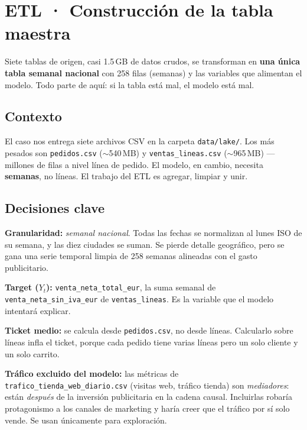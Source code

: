 \section{ETL · Construcción de la tabla maestra}

\begin{takeaway}
Siete tablas de origen, casi 1.5\,GB de datos crudos, se transforman en \textbf{una única tabla semanal nacional} con 258 filas (semanas) y las variables que alimentan el modelo. Todo parte de aquí: si la tabla está mal, el modelo está mal.
\end{takeaway}

\subsection{Contexto}

El caso nos entrega siete archivos CSV en la carpeta \texttt{data/lake/}. Los más pesados son \texttt{pedidos.csv} ($\sim$540\,MB) y \texttt{ventas\_lineas.csv} ($\sim$965\,MB) — millones de filas a nivel línea de pedido. El modelo, en cambio, necesita \textbf{semanas}, no líneas. El trabajo del ETL es agregar, limpiar y unir.

\subsection{Decisiones clave}

\begin{decisionbox}
\textbf{Granularidad:} \textit{semanal nacional}. Todas las fechas se normalizan al lunes ISO de su semana, y las diez ciudades se suman. Se pierde detalle geográfico, pero se gana una serie temporal limpia de 258 semanas alineadas con el gasto publicitario.
\end{decisionbox}

\begin{decisionbox}
\textbf{Target ($Y_t$):} \texttt{venta\_neta\_total\_eur}, la suma semanal de \texttt{venta\_neta\_sin\_iva\_eur} de \texttt{ventas\_lineas}. Es la variable que el modelo intentará explicar.
\end{decisionbox}

\begin{decisionbox}
\textbf{Ticket medio:} se calcula desde \texttt{pedidos.csv}, no desde líneas. Calcularlo sobre líneas infla el ticket, porque cada pedido tiene varias líneas pero un solo cliente y un solo carrito.
\end{decisionbox}

\begin{decisionbox}
\textbf{Tráfico excluido del modelo:} las métricas de \texttt{trafico\_tienda\_web\_diario.csv} (visitas web, tráfico tienda) son \textit{mediadores}: están \textit{después} de la inversión publicitaria en la cadena causal. Incluirlas robaría protagonismo a los canales de marketing y haría creer que el tráfico por sí solo vende. Se usan únicamente para exploración.
\end{decisionbox}

